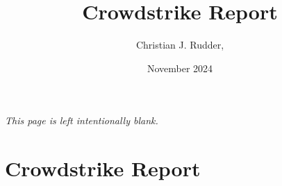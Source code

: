 \documentclass{memoir}
\title{Crowdstrike Report}
\author{Christian J. Rudder, }
\date{November 2024}
\begin{document}
\maketitle
\setcounter{tocdepth}{2}

\tableofcontents

\newpage
\thispagestyle{empty}
\mbox{}
\vfill
\begin{center}
    \textit{This page is left intentionally blank.}
\end{center}
\vfill
\newpage
\thispagestyle{empty}




\chapter{Crowdstrike Report}




\end{document}
